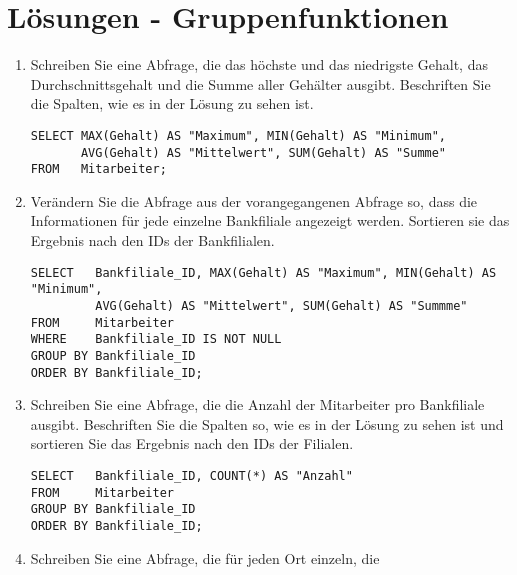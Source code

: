 \clearpage
    \section{Lösungen - Gruppenfunktionen}
      \begin{enumerate}
        \item Schreiben Sie eine Abfrage, die das höchste und das niedrigste
        Gehalt, das Durchschnittsgehalt und die Summe aller Gehälter ausgibt.
        Beschriften Sie die Spalten, wie es in der Lösung zu sehen ist.
        \begin{msoraclesql}[\FALSE]
        \end{msoraclesql}
        \begin{lstlisting}[language=oracle_sql]
SELECT MAX(Gehalt) AS "Maximum", MIN(Gehalt) AS "Minimum",
       AVG(Gehalt) AS "Mittelwert", SUM(Gehalt) AS "Summe"
FROM   Mitarbeiter;
        \end{lstlisting}
        \item Verändern Sie die Abfrage aus der vorangegangenen Abfrage so,
        dass die Informationen für jede einzelne Bankfiliale angezeigt werden.
        Sortieren sie das Ergebnis nach den IDs der Bankfilialen.
        \begin{msoraclesql}[\FALSE]
        \end{msoraclesql}
        \begin{lstlisting}[language=oracle_sql]
SELECT   Bankfiliale_ID, MAX(Gehalt) AS "Maximum", MIN(Gehalt) AS "Minimum",
         AVG(Gehalt) AS "Mittelwert", SUM(Gehalt) AS "Summme"
FROM     Mitarbeiter
WHERE    Bankfiliale_ID IS NOT NULL
GROUP BY Bankfiliale_ID
ORDER BY Bankfiliale_ID;
        \end{lstlisting}
        \item Schreiben Sie eine Abfrage, die die Anzahl der Mitarbeiter pro
        Bankfiliale ausgibt. Beschriften Sie die Spalten so, wie es in der
        Lösung zu sehen ist und sortieren Sie das Ergebnis nach den IDs der
        Filialen.
        \begin{msoraclesql}[\FALSE]
        \end{msoraclesql}
        \begin{lstlisting}[language=oracle_sql]
SELECT   Bankfiliale_ID, COUNT(*) AS "Anzahl"
FROM     Mitarbeiter
GROUP BY Bankfiliale_ID
ORDER BY Bankfiliale_ID;
        \end{lstlisting}
		\clearpage
        \item Schreiben Sie eine Abfrage, die für jeden Ort einzeln, die

\end{enumerate}
